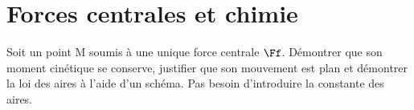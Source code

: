 \documentclass[a4paper, 10pt, final, garamond]{book}
\begin{document}
\setcounter{chapter}{20}


\chapter{Forces centrales et chimie}

\begin{enumerate}[label=\sqenumi]
	Soit un point M soumis à une unique force centrale $\Ff$. Démontrer que son
	moment cinétique se conserve, justifier que son mouvement est plan et
	démontrer la loi des aires à l'aide d'un schéma. Pas besoin d'introduire la
	constante des aires.
	\smallbreak
	\begin{isd}
		\vspace{-15pt}
		\tcblower
		\begin{center}
\end{center}
\end{isd}
\end{enumerate}
\end{document}
